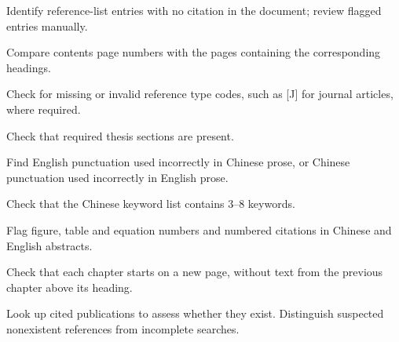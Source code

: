 \documentclass[12pt,a4paper]{article}
\begin{document}
\Needspace{26mm}\par{}\par Identify reference-list entries with no citation in the document; review flagged entries manually.\par
\Needspace{26mm}\par{}\par Compare contents page numbers with the pages containing the corresponding headings.\par
\Needspace{26mm}\par{}\par Check for missing or invalid reference type codes, such as [J] for journal articles, where required.\par
\Needspace{26mm}\par{}\par Check that required thesis sections are present.\par
\Needspace{26mm}\par{}\par Find English punctuation used incorrectly in Chinese prose, or Chinese punctuation used incorrectly in English prose.\par
\Needspace{26mm}\par{}\par Check that the Chinese keyword list contains 3–8 keywords.\par
\Needspace{26mm}\par{}\par Flag figure, table and equation numbers and numbered citations in Chinese and English abstracts.\par
\Needspace{26mm}\par{}\par Check that each chapter starts on a new page, without text from the previous chapter above its heading.\par
\Needspace{26mm}\par{}\par Look up cited publications to assess whether they exist. Distinguish suspected nonexistent references from incomplete searches.\par
\end{document}
